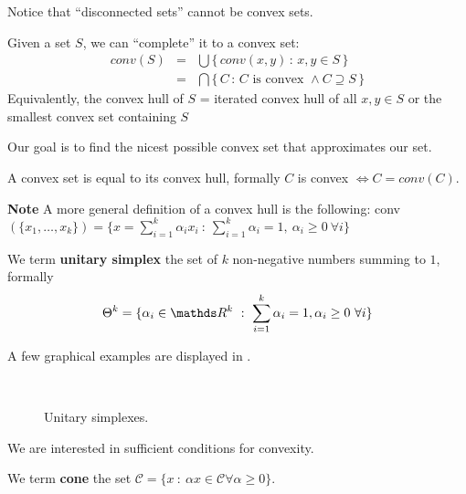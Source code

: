 \documentclass[computationalMathematics.tex]{subfiles}
\begin{document}
Notice that ``disconnected sets'' cannot be convex sets.

\begin{definition}
Given a set $S$, we can ``complete'' it to a convex set:
\[
\begin{array}{rcl}
 conv(S) & = &
 \bigcup \{ \, conv(x,y) \,:\, x, y \in S \, \} \\[0.2cm]
 & = &
 \bigcap \{ \, C \,:\, C \mbox{ is convex } \wedge
                         C \supseteq S \, \}
\end{array}
\]
Equivalently, the convex hull of $S$ = iterated convex hull of all $x, y \in S$ or the smallest convex set containing $S$
\end{definition}

Our goal is to find the nicest possible convex set that approximates our set.

\begin{proposition}
A convex set is equal to its convex hull, formally $C$ is convex $\iff C = conv(C)$.
\end{proposition}

\begin{myframe}{\bf Note}
A more general definition of a convex hull is the following:
conv$(\{x_1, \ldots, x_k\}) = \{x = \sum_{i=1}^k \alpha_i x_i~:~\sum_{i=1}^k \alpha_i = 1,~\alpha_i \geq 0~\forall i\}$ 
\end{myframe}

\begin{definition}
  We term \textbf{unitary simplex} the set of $k$ non-negative numbers summing to $1$, formally
\[
\Theta^k = \{\alpha_i \in \R^k~:~\sum_{i=1}^k \alpha_i = 1, \alpha_i \geq 0~\forall i\}
\]

  A few graphical examples are displayed in .
\end{definition}

\begin{figure}[h]
  \centering
  \hspace{0.5cm}
  \\
  \caption{Unitary simplexes.}\label{fig:5ott_2}
\end{figure}


We are interested in sufficient conditions for convexity.

\begin{definition}[Cone]
  We term \textbf{cone} the set $\mathcal{C} = \{x~:~\alpha x \in \mathcal{C}\forall\alpha \geq 0\}$.
\end{definition}
\end{document}
